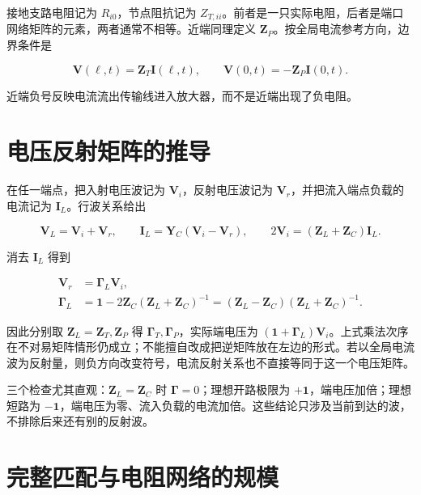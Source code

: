 \documentclass[
  11pt,
  a4paper,
  oneside,
  openany]{report}
\numberwithin{equation}{chapter}
\begin{document}
接地支路电阻记为 \(R_{i0}\)，节点阻抗记为
\(Z_{T,ii}\)。前者是一只实际电阻，后者是端口网络矩阵的元素，两者通常不相等。近端同理定义
\(\mathbf Z_P\)。按全局电流参考方向，边界条件是

\nopagebreak[3]
\begin{equation}
\mathbf V(\ell,t)=\mathbf Z_T\mathbf I(\ell,t),
\qquad
\mathbf V(0,t)=-\mathbf Z_P\mathbf I(0,t).
\end{equation}

近端负号反映电流流出传输线进入放大器，而不是近端出现了负电阻。

\section{电压反射矩阵的推导}\label{sec-reflection-matrix}

在任一端点，把入射电压波记为 \(\mathbf V_i\)，反射电压波记为
\(\mathbf V_r\)，并把流入端点负载的电流记为
\(\mathbf I_L\)。行波关系给出

\nopagebreak[3]
\begin{equation}
\mathbf V_L=\mathbf V_i+\mathbf V_r,\qquad
\mathbf I_L=\mathbf Y_C(\mathbf V_i-\mathbf V_r),\qquad
2\mathbf V_i=(\mathbf Z_L+\mathbf Z_C)\mathbf I_L.
\end{equation}

消去 \(\mathbf I_L\) 得到

\nopagebreak[3]
\begin{equation}
\begin{aligned}
\mathbf V_r&=\boldsymbol\Gamma_L\mathbf V_i,\\
\boldsymbol\Gamma_L
&=\mathbf 1-2\mathbf Z_C(\mathbf Z_L+\mathbf Z_C)^{-1}
=(\mathbf Z_L-\mathbf Z_C)(\mathbf Z_L+\mathbf Z_C)^{-1}.
\end{aligned}
\end{equation}

因此分别取 \(\mathbf Z_L=\mathbf Z_T,\mathbf Z_P\) 得
\(\boldsymbol\Gamma_T,\boldsymbol\Gamma_P\)，实际端电压为
\((\mathbf1+\boldsymbol\Gamma_L)\mathbf V_i\)。上式乘法次序在不对易矩阵情形仍成立；不能擅自改成把逆矩阵放在左边的形式。若以全局电流波为反射量，则负方向改变符号，电流反射关系也不直接等同于这一个电压矩阵。

三个检查尤其直观：\(\mathbf Z_L=\mathbf Z_C\) 时
\(\boldsymbol\Gamma=0\)；理想开路极限为
\(+\mathbf1\)，端电压加倍；理想短路为
\(-\mathbf1\)，端电压为零、流入负载的电流加倍。这些结论只涉及当前到达的波，不排除后来还有别的反射波。

\section{完整匹配与电阻网络的规模}\label{sec-matching}
\end{document}

